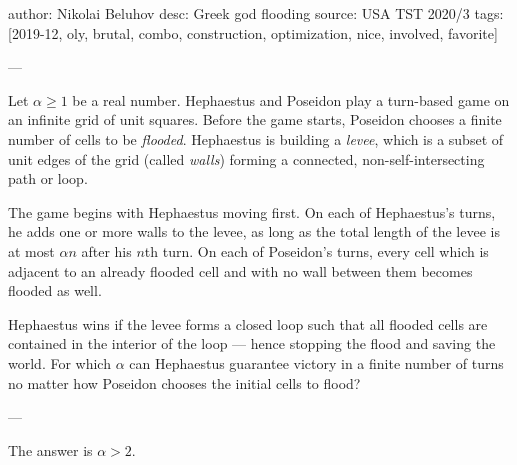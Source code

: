 author: Nikolai Beluhov
desc: Greek god flooding
source: USA TST 2020/3
tags: [2019-12, oly, brutal, combo, construction, optimization, nice, involved, favorite]

---

Let $\alpha\ge1$ be a real number. Hephaestus and Poseidon play a turn-based game on an infinite grid of unit squares. Before the game starts, Poseidon chooses a finite number of cells to be \emph{flooded}. Hephaestus is building a \emph{levee}, which is a subset of unit edges of the grid (called \emph{walls}) forming a connected, non-self-intersecting path or loop.%

The game begins with Hephaestus moving first. On each of Hephaestus's turns, he adds one or more walls to the levee, as long as the total length of the levee is at most $\alpha n$ after his $n$th turn. On each of Poseidon's turns, every cell which is adjacent to an already flooded cell and with no wall between them becomes flooded as well.

Hephaestus wins if the levee forms a closed loop such that all flooded cells are contained in the interior of the loop --- hence stopping the flood and saving the world. For which $\alpha$ can Hephaestus guarantee victory in a finite number of turns no matter how Poseidon chooses the initial cells to flood?

---

The answer is $\alpha>2$.

\bigskip

